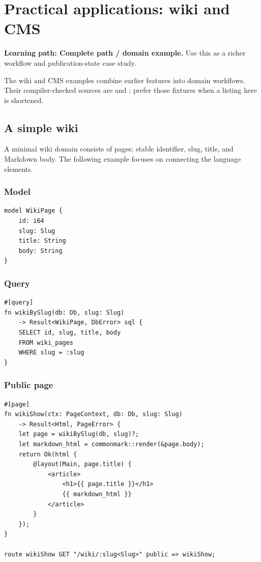 \chapter{Practical applications: wiki and CMS}

\noindent\textbf{Learning path: Complete path / domain example.} Use this as a richer workflow and publication-state case study.\par\medskip

The wiki and CMS examples combine earlier features into domain workflows. Their compiler-checked sources are  and ; prefer those fixtures when a listing here is shortened.

\section{A simple wiki}

A minimal wiki domain consists of pages: stable identifier, slug, title, and Markdown body. The following example focuses on connecting the language elements.

\subsection*{Model}

\begin{lstlisting}[language=Velran]
model WikiPage {
    id: i64
    slug: Slug
    title: String
    body: String
}
\end{lstlisting}

\subsection*{Query}

\begin{lstlisting}[language=Velran]
#[query]
fn wikiBySlug(db: Db, slug: Slug)
    -> Result<WikiPage, DbError> sql {
    SELECT id, slug, title, body
    FROM wiki_pages
    WHERE slug = :slug
}
\end{lstlisting}

\subsection*{Public page}

\begin{lstlisting}[language=Velran]
#[page]
fn wikiShow(ctx: PageContext, db: Db, slug: Slug)
    -> Result<Html, PageError> {
    let page = wikiBySlug(db, slug)?;
    let markdown_html = commonmark::render(&page.body);
    return Ok(html {
        @layout(Main, page.title) {
            <article>
                <h1>{{ page.title }}</h1>
                {{ markdown_html }}
            </article>
        }
    });
}

route wikiShow GET "/wiki/:slug<Slug>" public => wikiShow;
\end{lstlisting}

